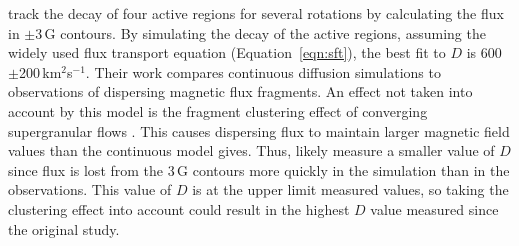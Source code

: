 \cite{Wang:1989} track the decay of four active regions for several rotations by calculating the flux in $\pm$3\,G contours. By simulating the decay of the active regions, assuming the widely used flux transport equation (Equation~\ref{eqn:sft}), the best fit to $D$ is 600$\pm$200\,km$^2$s$^{-1}$. Their work compares continuous diffusion simulations to observations of dispersing magnetic flux fragments. An effect not taken into account by this model is the fragment clustering effect of converging supergranular flows \citep{Schrijver:1992}. This causes dispersing flux to maintain larger magnetic field values than the continuous model gives. Thus, \cite{Wang:1989} likely measure a smaller value of $D$ since flux is lost from the 3\,G contours more quickly in the simulation than in the observations. This value of $D$ is at the upper limit measured values, so taking the clustering effect into account could result in the highest $D$ value measured since the original \cite{Leighton:1964} study. 






